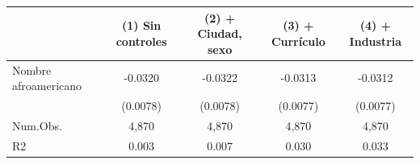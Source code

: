 \begin{table}
\centering
\begin{tabular}[t]{lcccc}
\toprule
  & (1) Sin controles & (2) + Ciudad, sexo & (3) + Currículo & (4) + Industria\\
\midrule
Nombre afroamericano & -0.0320 & -0.0322 & -0.0313 & -0.0312\\
 & (0.0078) & (0.0078) & (0.0077) & (0.0077)\\
\midrule
Num.Obs. & 4,870 & 4,870 & 4,870 & 4,870\\
R2 & 0.003 & 0.007 & 0.030 & 0.033\\
\bottomrule
\end{tabular}
\end{table}
